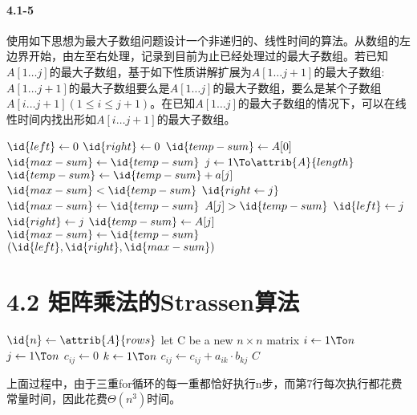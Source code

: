 \documentclass[a4paper,11pt]{article}
\begin{document}
\paragraph*{4.1-5}
使用如下思想为最大子数组问题设计一个非递归的、线性时间的算法。从数组的左边界开始，由左至右处理，记录到目前为止已经处理过的最大子数组。若已知$A[1 \dots j]$的最大子数组，基于如下性质讲解扩展为$A[1 \dots j+1]$的最大子数组:$A[1 \dots j+1]$的最大子数组要么是$A[1 \dots j]$的最大子数组，要么是某个子数组$A[i \dots j+1](1 \leq i \leq j+1)$。在已知$A[1 \dots j]$的最大子数组的情况下，可以在线性时间内找出形如$A[i \dots j+1]$的最大子数组。
\begin{codebox}
	\li	$\id{left} \gets 0$
	\li $\id{right} \gets 0$
	\li $\id{temp-sum} \gets A[0]$
	\li $\id{max-sum} \gets \id{temp-sum}$
	\li \For $j \gets 1 \To \attrib{A}{length}$
	\li		\Do $\id{temp-sum} \gets \id{temp-sum} + a[j]$
	\li		\If $\id{max-sum} < \id{temp-sum}$
	\li			\Then $\id{right \gets j}$
	\li			$\id{max-sum} \gets \id{temp-sum}$
	\li			\Else
	\li				\If $A[j] > \id{temp-sum}$
	\li					\Then $\id{left} \gets j$
	\li					$\id{right} \gets j$
	\li					$\id{temp-sum} \gets A[j]$
	\li					$\id{max-sum} \gets \id{temp-sum}$
							\End
					\End
				\End
	\li \Return $(\id{left},\id{right},\id{max-sum})$
\end{codebox}
\section*{4.2 矩阵乘法的Strassen算法}
\begin{codebox}
	\li $\id{n} \gets \attrib{A}{rows}$
	\li let C be a new $n \times n$ matrix
	\li \For $i \gets 1 \To n$
	\li		\Do
				\For $j \gets 1 \To n$
	\li			\Do $c_{ij} \gets 0$
	\li			\For $k \gets 1 \To n$
	\li				\Do	$c_{ij} \gets c_{ij} + a_{ik} \cdot b_{kj}$
						\End
					\End
				\End
	\li	\Return $C$
\end{codebox}
上面过程中，由于三重for循环的每一重都恰好执行n步，而第7行每次执行都花费常量时间，因此花费$\Theta(n^3)$时间。
\end{document}
